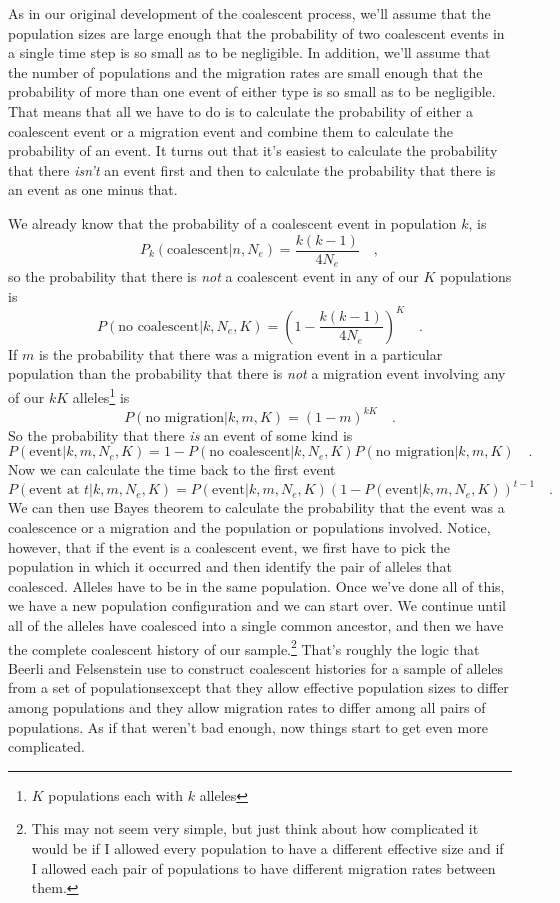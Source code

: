 \noindent As in our original development of the coalescent process,
we'll assume that the population sizes are large enough that the
probability of two coalescent events in a single time step is so small
as to be negligible. In addition, we'll assume that the number of
populations and the migration rates are small enough that the
probability of more than one event of either type is so small as to be
negligible. That means that all we have to do is to calculate the
probability of either a coalescent event or a migration event and
combine them to calculate the probability of an event. It turns out
that it's easiest to calculate the probability that there {\it
  isn't\/} an event first and then to calculate the probability that
there is an event as one minus that.

We already know that the probability of a coalescent event in
population $k$, is
\[
P_k(\mbox{coalescent}|n, N_e) = \frac{k(k-1)}{4N_e} \quad ,
\]
so the probability that there is {\it not\/} a coalescent event in any
of our $K$ populations is
\[
P(\mbox{no coalescent}|k, N_e, K) = \left(1-\frac{k(k-1)}{4N_e}\right)^K
\quad .
\]
If $m$ is the probability that there was a migration event in a
particular population than the probability that there is {\it not\/} a
migration event involving any of our $kK$ alleles\footnote{$K$ populations
each with $k$ alleles} is
\[
P(\mbox{no migration}|k,m, K) = (1-m)^{kK} \quad .
\]
So the probability that there {\it is\/} an event of some kind is
\[
P(\mbox{event}|k, m, N_e, K) = 1 - P(\mbox{no coalescent}|k, N_e,
K)P(\mbox{no migration}|k,m, K) \quad .\label{eq:event}
\]
Now we can calculate the time back to the first event
\[
P(\mbox{event at }t|k, m, N_e, K) = P(\mbox{event}|k, m, N_e,
K)\left(1 - P(\mbox{event}|k, m, N_e, K)\right)^{t-1} \quad . \label{eq:time-to-event}
\]
We can then use Bayes theorem to calculate the probability that the
event was a coalescence or a migration and the population or
populations involved. Notice, however, that if the event is a
coalescent event, we first have to pick the population in which it
occurred and then identify the pair of alleles that coalesced. Alleles
have to be in the same population. Once we've done all of this, we
have a new population configuration and we can start over. We continue
until all of the alleles have coalesced into a single common ancestor,
and then we have the complete coalescent history of our
sample.\footnote{This may not seem very simple, but just think about
  how complicated it would be if I allowed every population to have a
  different effective size and if I allowed each pair of populations
  to have different migration rates between them.} That's roughly the
logic that Beerli and Felsenstein use to construct coalescent
histories for a sample of alleles from a set of
populations{\dash}except that they allow effective population sizes to
differ among populations and they allow migration rates to differ
among all pairs of populations. As if that weren't bad enough, now
things start to get even more complicated.

